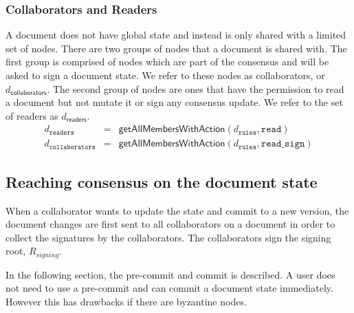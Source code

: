 \subsubsection{Collaborators and Readers}
A document does not have global state and instead is only shared with a limited set of nodes. There are two groups of nodes that a document is shared with. The first group is comprised of nodes which are part of the consensus and will be asked to sign a document state. We refer to these nodes as collaborators, or $d_{\mathsf{collaborators}}$. The second group of nodes are ones that have the permission to read a document but not mutate it or sign any consensus update. We refer to the set of readers as $d_{\mathsf{readers}}$.\\
\begin{eqnarray}
d_{\mathtt{readers}} & = & \mathsf{getAllMembersWithAction}( d_\mathtt{rules} ,\mathtt{read}) \\
d_{\mathtt{collaborators}} &  = & \mathsf{getAllMembersWithAction}( d_\mathtt{rules} ,\mathtt{read\_sign}) 
\end{eqnarray}

\subsection{Reaching consensus on the document state}\label{sec:reach_consensus}
When a collaborator wants to update the state and commit to a new version, the document changes are first sent to all collaborators on a document in order to collect the signatures by the collaborators. The collaborators sign the signing root, $R_{signing}$.

In the following section, the pre-commit and commit is described. A user does not need to use a pre-commit and can commit a document state immediately. However this has drawbacks if there are byzantine nodes.


